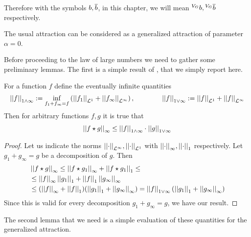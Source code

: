 Therefore with the symbols $\drift,\mfdrift$, in this chapter, we will mean ${}^{\genAttraction}\drift, {}^{\genAttraction}\mfdrift$ respectively.

\begin{remark}
	The usual attraction can be considered as a generalized attraction of parameter $\alpha = 0$.
\end{remark}

Before proceeding to the law of large numbers we need to gather some preliminary lemmas.
The first is a simple result of \autocite{peter-boers}, that we simply report here.

\begin{lemma}\label{ch5:lemma:<-1+infty-norm}
	For a function $f$ define the eventually infinite quantities
	\begin{gather*}
		\Normp{1 \wedge \infty}{f} := 
		\inf_{f_1 + f_\infty = f} 
		\left( 
		\Normp{\Lpspace^1}{f_1} + \Normp{\Lpspace^\infty}{f_\infty}
		\right),
		\qquad
		\qquad
		\Norm{f}_{1 \vee \infty} := 
		\Normp{\Lpspace^1}{f} + \Normp{\Lpspace^\infty}{f}
	\end{gather*}
	Then for arbitrary functions $f,g$ it is true that
	\begin{equation}
		\Norm{f \star g}_\infty
		\leq
		\Norm{f}_{1 \wedge \infty} \cdot \Norm{g}_{1 \vee \infty}
	\end{equation}
\end{lemma}

\begin{proof}
	Let us indicate the norms $\Normp{\Lpspace^\infty}{\cdot},\Normp{\Lpspace^1}{\cdot}$ with $ \Normp{\infty}{\cdot}, \Normp{1}{\cdot}$ respectively.
	Let $g_1 + g_\infty = g$ be a decomposition of $g$.
	Then
	\begin{align*}
		&\Norm{f \star g}_\infty 
		\leq 
		\Norm{f \star g_1}_\infty + \Norm{f \star g_1}_1
		\leq
		\\
		&\leq
		\Norm{f}_\infty \Norm{g_1}_1 + \Norm{f}_1 \Norm{g_\infty}_\infty
		\\
		&\leq
		(\Norm{f}_\infty + \Norm{f}_1) ( \Norm{g_1}_1 + \Norm{g_\infty}_\infty)
		= \Norm{f}_{1 \vee \infty}	( \Norm{g_1}_1 + \Norm{g_\infty}_\infty)
	\end{align*}
	Since this is valid for every decomposition $g_1 + g_\infty = g$, we have our result.
\end{proof}

The second lemma that we need is a simple evaluation of these quantities for the generalized attraction.


